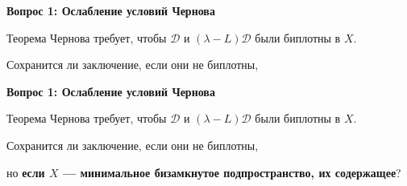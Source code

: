 \documentclass[11pt]{article}
\begin{document}
\newpage

\begin{center}
{\color{notaeYELLOW}\bfseries\fontsize{44}{52}\selectfont Вопрос 1: Ослабление условий Чернова}
\end{center}
\vspace*{\fill}
\begin{center}
\fontsize{36}{43}\selectfont
\parbox{\linewidth}{\centering\noindent Теорема Чернова требует, чтобы $\mathcal{D}$ и $(\lambda-L)\mathcal{D}$ были биплотны в $X$.
\par}\vspace{0.4in}
\parbox{\linewidth}{\centering\noindent Сохранится ли заключение, если они не биплотны,
\par}\vspace{0.4in}
\end{center}
\vspace*{\fill}

\newpage

\begin{center}
{\color{notaeYELLOW}\bfseries\fontsize{44}{52}\selectfont Вопрос 1: Ослабление условий Чернова}
\end{center}
\vspace*{\fill}
\begin{center}
\fontsize{36}{43}\selectfont
\parbox{\linewidth}{\centering\noindent Теорема Чернова требует, чтобы $\mathcal{D}$ и $(\lambda-L)\mathcal{D}$ были биплотны в $X$.
\par}\vspace{0.4in}
\parbox{\linewidth}{\centering\noindent Сохранится ли заключение, если они не биплотны,
\par}\vspace{0.4in}
\parbox{\linewidth}{\centering\noindent но \textbf{если $X$ --- минимальное бизамкнутое подпространство, их содержащее}?
\par}\vspace{0.4in}
\end{center}
\vspace*{\fill}

\newpage
\end{document}

